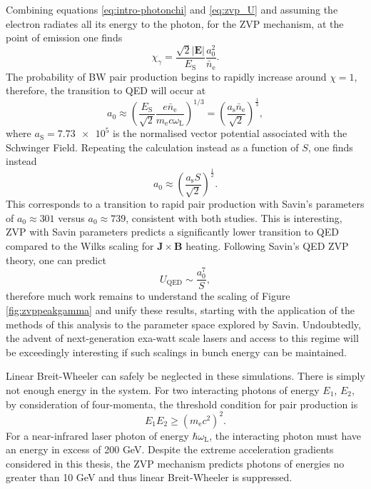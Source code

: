 Combining equations \ref{eq:intro-photonchi} and \ref{eq:zvp_U} and assuming the electron radiates all its energy to the photon, for the ZVP mechanism, at the point of emission one finds
\begin{equation}
	\chi_\gamma =\frac{ \sqrt{2} |\mathbf{E}|}{E_\mathrm{S}}\frac{a^2_0}{\bar{n}_\mathrm{e}}.
\end{equation}
The probability of \ac{BW} pair production begins to rapidly increase around $\chi =1$, therefore, the transition to QED will occur at
\begin{equation}
	a_0 \approx \left(\frac{ E_\mathrm{S}}{\sqrt{2}}\frac{e\bar{n}_\mathrm{e}}{m_\mathrm{e}c\omega_\mathrm{L}}\right)^{1/3} = \left(\frac{a_\mathrm{s}\bar{n}_\mathrm{e}}{\sqrt{2}}\right)^{\frac{1}{3}},
\end{equation}
where $a_\mathrm{S} = \num{7.73e5}$ is the normalised vector potential associated with the Schwinger Field. Repeating the calculation instead as a function of $S$, one finds instead
\begin{equation}
	a_0 \approx \left(\frac{a_\mathrm{s}S}{\sqrt{2}}\right)^{\frac{1}{2}}.
\end{equation}
This corresponds to a transition to rapid pair production with Savin's parameters of $a_0 \approx 301$ versus $a_0 \approx 739$, consistent with both studies. This is interesting, ZVP with Savin parameters predicts a significantly lower transition to QED compared to the Wilks scaling for $\mathbf{J}\times\mathbf{B}$ heating. Following Savin's QED ZVP theory, one can predict
\begin{equation}
	U_\mathrm{QED} \sim \frac{a^7_0}{S},
\end{equation}
therefore much work remains to understand the scaling of Figure \ref{fig:zvppeakgamma} and unify these results, starting with the application of the methods of this analysis to the parameter space explored by Savin. Undoubtedly, the advent of next-generation exa-watt scale lasers and access to this regime will be exceedingly interesting if such scalings in bunch energy can be maintained.

Linear Breit-Wheeler can safely be neglected in these simulations. There is simply not enough energy in the system. For two interacting photons of energy $E_1$, $E_2$, by consideration of four-momenta, the threshold condition for pair production is 
\begin{equation}
	E_1E_2 \ge (m_\mathrm{e}c^2)^2.
\end{equation}
For a near-infrared laser photon of energy $\hbar \omega_\mathrm{L}$, the interacting photon must have an energy in excess of 200 GeV. Despite the extreme acceleration gradients considered in this thesis, the ZVP mechanism predicts photons of energies no greater than 10 GeV and thus linear Breit-Wheeler is suppressed.

